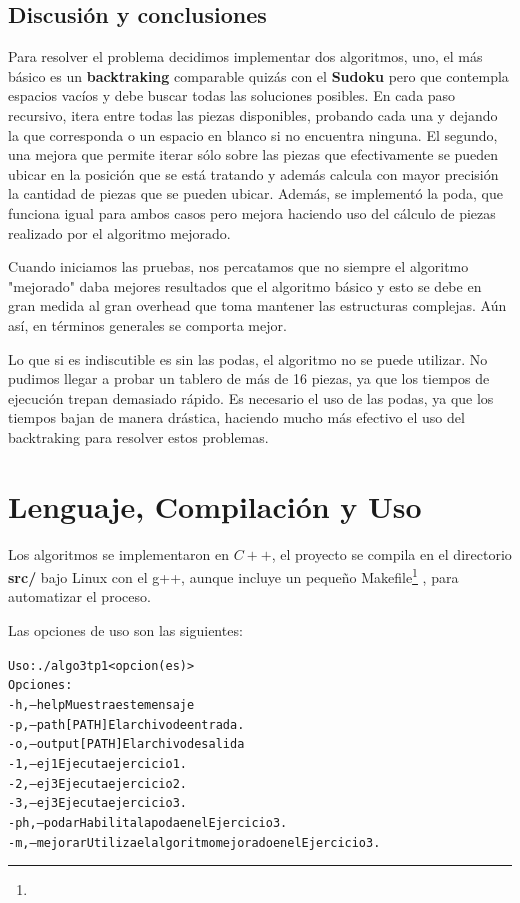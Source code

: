 \documentclass[11pt,a4paper]{article}
\begin{document}
\subsection*{Discusión y conclusiones}

Para resolver el problema decidimos implementar dos algoritmos, uno, el más básico es un \textbf{backtraking} comparable quizás con el \textbf{Sudoku} pero que contempla espacios vacíos y debe buscar todas las soluciones posibles. En cada paso recursivo, itera entre todas las piezas disponibles, probando cada una y dejando la que corresponda o un espacio en blanco si no encuentra ninguna. El segundo, una mejora que permite iterar sólo sobre las piezas que efectivamente se pueden ubicar en la posición que se está tratando y además calcula con mayor precisión la cantidad de piezas que se pueden ubicar. Además, se implementó la poda, que funciona igual para ambos casos pero mejora haciendo uso del cálculo de piezas realizado por el algoritmo mejorado.

Cuando iniciamos las pruebas, nos percatamos que no siempre el algoritmo "mejorado" daba mejores resultados que el algoritmo básico y esto se debe en gran medida al gran overhead que toma mantener las estructuras complejas. Aún así, en términos generales se comporta mejor.

Lo que si es indiscutible es sin las podas, el algoritmo no se puede utilizar. No pudimos llegar a probar un tablero de más de 16 piezas, ya que los tiempos de ejecución trepan demasiado rápido. Es necesario el uso de las podas, ya que los tiempos bajan de manera drástica, haciendo mucho más efectivo el uso del backtraking para resolver estos problemas.

\newpage

\section*{Lenguaje, Compilación y Uso}

Los algoritmos se implementaron en $C++$, el proyecto se compila en el directorio \textbf{src/} bajo Linux con el g++, aunque incluye un pequeño Makefile\footnote{\wikiMakefile} , para automatizar el proceso.

Las opciones de uso son las siguientes:
\begin{alltt}\begin{scriptsize}
Uso: ./algo3tp1 <opcion(es)>
Opciones:
	-h,   --help             Muestra este mensaje
	-p,   --path     [PATH]  El archivo de entrada.
	-o,   --output   [PATH]  El archivo de salida
	-1,   --ej1              Ejecuta ejercicio 1.
	-2,   --ej3              Ejecuta ejercicio 2.
	-3,   --ej3              Ejecuta ejercicio 3.
	-ph,  --podar            Habilita la poda en el Ejercicio 3.
	-m,   --mejorar          Utiliza el algoritmo mejorado en el Ejercicio 3.
\end{scriptsize}\end{alltt}
\end{document}
